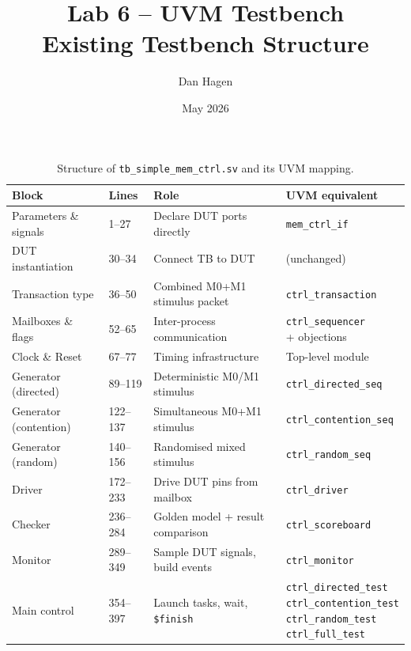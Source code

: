 \documentclass[a4paper,11pt]{article}
\title{\textbf{Lab 6 -- UVM Testbench}\\[0.4em]
       \large Existing Testbench Structure}
\author{Dan Hagen}
\date{May 2026}
\begin{document}
\maketitle

\begin{table}[h]
\centering
\begin{tabular}{llll}
  \toprule
  Block & Lines & Role & UVM equivalent \\
  \midrule
  Parameters \& signals & 1--27    & Declare DUT ports directly       & \texttt{mem\_ctrl\_if} \\ \hline
  DUT instantiation     & 30--34   & Connect TB to DUT                & (unchanged) \\ \hline
  Transaction type      & 36--50   & Combined M0+M1 stimulus packet   & \texttt{ctrl\_transaction} \\ \hline
  Mailboxes \& flags    & 52--65   & Inter-process communication      & \makecell[l]{\texttt{ctrl\_sequencer}\\+ objections} \\ \hline
  Clock \& Reset        & 67--77   & Timing infrastructure            & Top-level module \\ \hline
  Generator (directed)  & 89--119  & Deterministic M0/M1 stimulus     & \texttt{ctrl\_directed\_seq} \\ \hline
  Generator (contention)& 122--137 & Simultaneous M0+M1 stimulus      & \texttt{ctrl\_contention\_seq} \\ \hline
  Generator (random)    & 140--156 & Randomised mixed stimulus        & \texttt{ctrl\_random\_seq} \\ \hline
  Driver                & 172--233 & Drive DUT pins from mailbox      & \texttt{ctrl\_driver} \\ \hline
  Checker               & 236--284 & Golden model + result comparison & \texttt{ctrl\_scoreboard} \\ \hline
  Monitor               & 289--349 & Sample DUT signals, build events & \texttt{ctrl\_monitor} \\ \hline
  Main control          & 354--397 & \makecell[l]{Launch tasks,\\wait, \texttt{\$finish}} & \makecell[l]{\texttt{ctrl\_directed\_test}\\\texttt{ctrl\_contention\_test}\\\texttt{ctrl\_random\_test}\\\texttt{ctrl\_full\_test}} \\
  \bottomrule
\end{tabular}
\caption{Structure of \texttt{tb\_simple\_mem\_ctrl.sv} and its UVM mapping.}
\end{table}
\end{document}

